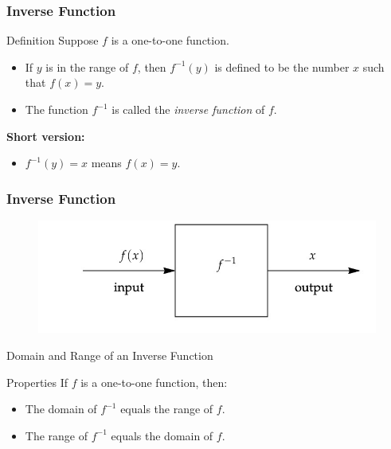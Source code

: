 \documentclass{beamer}
\begin{document}
\begin{frame}
  \frametitle{Inverse Function}
  \begin{block}{Definition}
    Suppose \( f \) is a one-to-one function.
    \begin{itemize}
      \item If \( y \) is in the range of \( f \), then \( f^{-1}(y) \) is defined to be the number \( x \) such that \( f(x) = y \).
      \item The function \( f^{-1} \) is called the \emph{inverse function} of \( f \).
    \end{itemize}
    \vspace{1em}
    \textbf{Short version:}
    \begin{itemize}
      \item \( f^{-1}(y) = x \) means \( f(x) = y \).
    \end{itemize}
    \end{block}
\end{frame}
\begin{frame}
  \frametitle{Inverse Function}
\begin{figure}
  \centering
  \includegraphics[scale=0.4]{inverse.jpeg}
\end{figure}
\end{frame}
\begin{frame}{Domain and Range of an Inverse Function}
  \begin{block}{Properties}
  If \( f \) is a one-to-one function, then:
  \begin{itemize}
    \item The domain of \( f^{-1} \) equals the range of \( f \).
    \item The range of \( f^{-1} \) equals the domain of \( f \).
  \end{itemize}
  \end{block}
  \end{frame}
\end{document}
